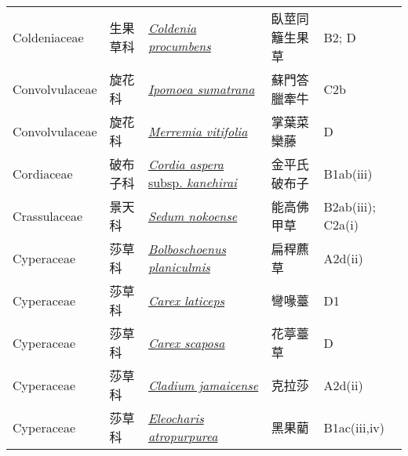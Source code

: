 {\begin{longtable}{p{2.5cm}p{2.5cm}p{4.5cm}p{2.5cm}p{3cm}}
    Coldeniaceae & 生果草科 & \href{http://www.theplantlist.org/tpl1.1/search?q=Coldenia+procumbens}{\textit{Coldenia procumbens} } & 臥莖同籬生果草 & B2; D \index{Coldenia@\textit{Coldenia}!procumbens@\textit{procumbens}}  \index{臥莖同籬生果草} \\
    Convolvulaceae & 旋花科 & \href{http://www.theplantlist.org/tpl1.1/search?q=Ipomoea+sumatrana}{\textit{Ipomoea sumatrana} } & 蘇門答臘牽牛 & C2b \index{Ipomoea@\textit{Ipomoea}!sumatrana@\textit{sumatrana}}  \index{蘇門答臘牽牛} \\
    Convolvulaceae & 旋花科 & \href{http://www.theplantlist.org/tpl1.1/search?q=Merremia+vitifolia}{\textit{Merremia vitifolia} } & 掌葉菜欒藤 & D \index{Merremia@\textit{Merremia}!vitifolia@\textit{vitifolia}}  \index{掌葉菜欒藤} \\
    Cordiaceae & 破布子科 & \href{http://www.theplantlist.org/tpl1.1/search?q=Cordia+aspera+subsp.+kanehirai}{\textit{Cordia aspera} subsp. \textit{kanehirai} } & 金平氏破布子 & B1ab(iii) \index{Cordia@\textit{Cordia}!aspera@\textit{aspera}!subsp. kanehirai@subsp. \textit{kanehirai}}  \index{金平氏破布子} \\
    Crassulaceae & 景天科 & \href{http://www.theplantlist.org/tpl1.1/search?q=Sedum+nokoense}{\textit{Sedum nokoense} } & 能高佛甲草 & B2ab(iii); C2a(i) \index{Sedum@\textit{Sedum}!nokoense@\textit{nokoense}}  \index{能高佛甲草} \\
    Cyperaceae & 莎草科 & \href{http://www.theplantlist.org/tpl1.1/search?q=Bolboschoenus+planiculmis}{\textit{Bolboschoenus planiculmis} } & 扁稈藨草 & A2d(ii) \index{Bolboschoenus@\textit{Bolboschoenus}!planiculmis@\textit{planiculmis}}  \index{扁稈藨草} \\
    Cyperaceae & 莎草科 & \href{http://www.theplantlist.org/tpl1.1/search?q=Carex+laticeps}{\textit{Carex laticeps} } & 彎喙薹 & D1 \index{Carex@\textit{Carex}!laticeps@\textit{laticeps}}  \index{彎喙薹} \\
    Cyperaceae & 莎草科 & \href{http://www.theplantlist.org/tpl1.1/search?q=Carex+scaposa}{\textit{Carex scaposa} } & 花葶薹草 & D \index{Carex@\textit{Carex}!scaposa@\textit{scaposa}}  \index{花葶薹草} \\
    Cyperaceae & 莎草科 & \href{http://www.theplantlist.org/tpl1.1/search?q=Cladium+jamaicense}{\textit{Cladium jamaicense} } & 克拉莎 & A2d(ii) \index{Cladium@\textit{Cladium}!jamaicense@\textit{jamaicense}}  \index{克拉莎} \\
    Cyperaceae & 莎草科 & \href{http://www.theplantlist.org/tpl1.1/search?q=Eleocharis+atropurpurea}{\textit{Eleocharis atropurpurea} } & 黑果藺 & B1ac(iii,iv) \index{Eleocharis@\textit{Eleocharis}!atropurpurea@\textit{atropurpurea}}  \index{黑果藺} \\

\end{longtable}}
